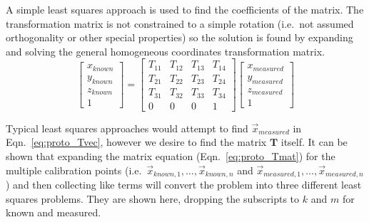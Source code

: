 A simple least squares approach is used to find the coefficients of the matrix. %
The transformation matrix is not constrained to a simple rotation (i.e.\ not assumed orthogonality or other special properties) so the solution is found by expanding and solving the general homogeneous coordinates transformation matrix.
\begin{equation}
    \begin{bmatrix}
        x_{known} \\
        y_{known} \\
        z_{known} \\
        1
    \end{bmatrix} =
    \begin{bmatrix}
        T_{11} & T_{12} & T_{13} &T_{14} \\
        T_{21} & T_{22} & T_{23} &T_{24} \\
        T_{31} & T_{32} & T_{33} &T_{34} \\
        0 & 0 & 0 & 1
    \end{bmatrix}
    \begin{bmatrix}
        x_{measured} \\
        y_{measured} \\
        z_{measured} \\
        1
    \end{bmatrix}
    \label{eq:proto_Tmat}
\end{equation}

Typical least squares approaches would attempt to find $\vec{x}_{measured}$ in Eqn.\ \ref{eq:proto_Tvec}, however we desire to find the matrix $\mathbf{T}$ itself.
It can be shown that expanding the matrix equation (Eqn.\ \ref{eq:proto_Tmat}) for the multiple calibration points (i.e.\ $\vec{x}_{known,1},\dots,\vec{x}_{known,n}$ and $\vec{x}_{measured,1},\dots,\vec{x}_{measured,n}$) and then collecting like terms will convert the problem into three different least squares problems.
They are shown here, dropping the subscripts to $k$ and $m$ for known and measured.

